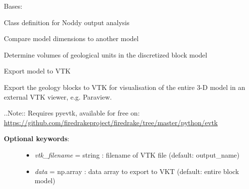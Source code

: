 \documentclass[a4paper,10pt,english]{sphinxmanual}
\begin{document}
\begin{fulllineitems}
\label{pynoddy:pynoddy.output.NoddyOutput}
Bases: 

Class definition for Noddy output analysis

\begin{fulllineitems}
\label{pynoddy:pynoddy.output.NoddyOutput.compare_dimensions_to}
Compare model dimensions to another model

\end{fulllineitems}


\begin{fulllineitems}
\label{pynoddy:pynoddy.output.NoddyOutput.determine_unit_volumes}
Determine volumes of geological units in the discretized block model

\end{fulllineitems}


\begin{fulllineitems}
\label{pynoddy:pynoddy.output.NoddyOutput.export_to_vtk}
Export model to VTK

Export the geology blocks to VTK for visualisation of the entire 3-D model in an
external VTK viewer, e.g. Paraview.

..Note:: Requires pyevtk, available for free on: \href{https://github.com/firedrakeproject/firedrake/tree/master/python/evtk}{https://github.com/firedrakeproject/firedrake/tree/master/python/evtk}
\begin{description}
\item[{\textbf{Optional keywords}:}] \leavevmode\begin{itemize}
\item {} 
\emph{vtk\_filename} = string : filename of VTK file (default: output\_name)

\item {} 
\emph{data} = np.array : data array to export to VKT (default: entire block model)


\end{itemize}
\end{description}
\end{fulllineitems}
\end{fulllineitems}
\end{document}
